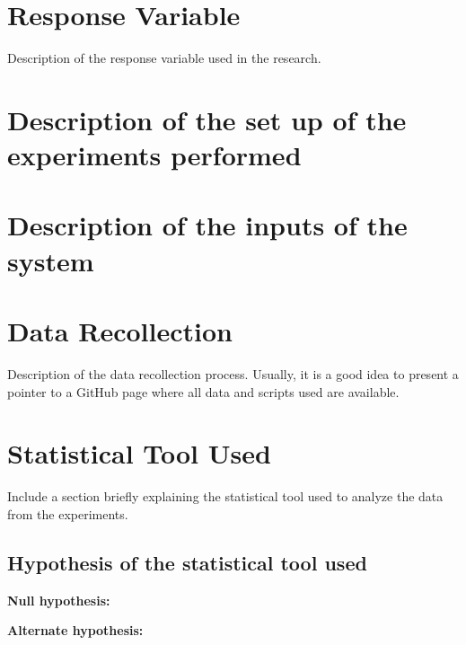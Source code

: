 \section{Response Variable}
Description of the response variable used in the research.

\section{Description of the set up of the experiments performed}

\section{Description of the inputs of the system}

\section{Data Recollection}

Description of the data recollection process. Usually, it is a good idea to present a pointer to a GitHub page where all data and scripts used are available.

\section{Statistical Tool Used}

Include a section briefly explaining the statistical tool used to analyze the data from the experiments.
\subsection{Hypothesis of the statistical tool used}

\textbf{Null hypothesis:}

\textbf{Alternate hypothesis:} 
